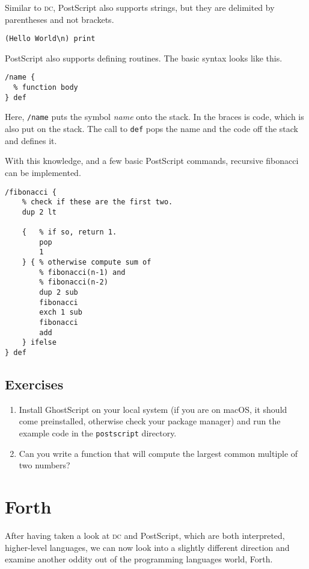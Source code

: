 \documentclass[a4paper,twocolumn]{article}
\begin{document}
Similar to \textsc{dc}, PostScript also supports strings, but they are delimited by parentheses and not brackets. 

\begin{verbatim}
(Hello World\n) print  
\end{verbatim}

PostScript also supports defining routines. The basic syntax looks like this.

\begin{verbatim}
/name {
  % function body
} def
\end{verbatim}

Here, \verb|/name| puts the symbol \emph{name} onto the stack. In the braces is code, which is also put on the stack. The call to \verb|def| pops the name and the code off the stack and defines it.

With this knowledge, and a few basic PostScript commands, recursive fibonacci can be implemented.

\begin{verbatim}
/fibonacci {
    % check if these are the first two.
    dup 2 lt

    {   % if so, return 1.
        pop
        1
    } { % otherwise compute sum of
        % fibonacci(n-1) and 
        % fibonacci(n-2)
        dup 2 sub
        fibonacci
        exch 1 sub
        fibonacci
        add
    } ifelse
} def
\end{verbatim}



\subsection*{Exercises}

\begin{enumerate}
  \item Install GhostScript on your local system (if you are on macOS, it should come preinstalled, otherwise check your package manager) and run the example code in the \verb|postscript| directory.
 
  \item Can you write a function that will compute the largest common multiple of two numbers?
\end{enumerate}

\section{Forth}

After having taken a look at \textsc{dc} and PostScript, which are both interpreted, higher-level languages, we can now look into a slightly different direction and examine another oddity out of the programming languages world, Forth. 
\end{document}
